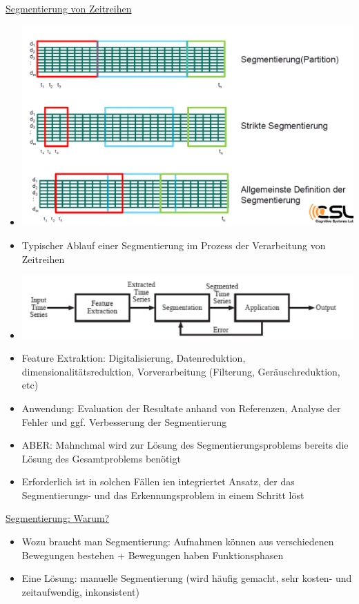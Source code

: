 \documentclass[a4paper,10pt,oneside]{article}
\begin{document}
\underline{Segmentierung von Zeitreihen} \\
	\begin{itemize}
		\item[] \includegraphics[scale=0.2]{Grafiken/2305.png}
		\item Typischer Ablauf einer Segmentierung im Prozess der Verarbeitung von Zeitreihen
		\item[]\includegraphics[scale=0.2]{Grafiken/2306.png} 
		\item Feature Extraktion: Digitalisierung, Datenreduktion, dimensionalitätsreduktion, Vorverarbeitung (Filterung, Geräuschreduktion, etc)
		\item Anwendung: Evaluation der Resultate anhand von Referenzen, Analyse der Fehler und ggf. Verbesserung der Segmentierung
		\item ABER: Mahnchmal wird zur Lösung des Segmentierungsproblems bereits die Lösung des Gesamtproblems benötigt
		\item Erforderlich ist in solchen Fällen ien integriertet Ansatz, der das Segmentierungs- und das Erkennungsproblem in einem Schritt löst
	\end{itemize}

\underline{Segmentierung: Warum?} \\
	\begin{itemize}
		\item Wozu braucht man Segmentierung: Aufnahmen können aus verschiedenen Bewegungen bestehen + Bewegungen haben Funktionsphasen
		\item Eine Lösung: manuelle Segmentierung (wird häufig gemacht, sehr kosten- und zeitaufwendig, inkonsistent)
	\end{itemize}
	
\end{document}
